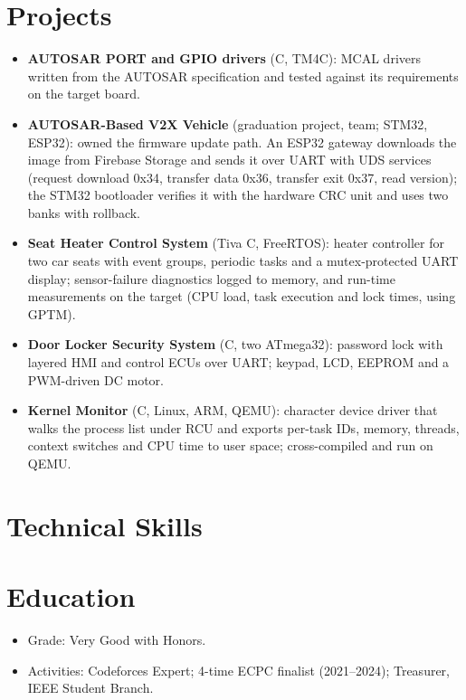 \documentclass[10pt]{article}
\begin{document}
\section*{Projects}
\begin{itemize}
  \item \textbf{AUTOSAR PORT and GPIO drivers} (C, TM4C): MCAL drivers written from the AUTOSAR specification and tested against its requirements on the target board.
  \item \textbf{AUTOSAR-Based V2X Vehicle} (graduation project, team; STM32, ESP32): owned the firmware update path. An ESP32 gateway downloads the image from Firebase Storage and sends it over UART with UDS services (request download 0x34, transfer data 0x36, transfer exit 0x37, read version); the STM32 bootloader verifies it with the hardware CRC unit and uses two banks with rollback. 
  \item \textbf{Seat Heater Control System} (Tiva C, FreeRTOS): heater controller for two car seats with event groups, periodic tasks and a mutex-protected UART display; sensor-failure diagnostics logged to memory, and run-time measurements on the target (CPU load, task execution and lock times, using GPTM). 
  \item \textbf{Door Locker Security System} (C, two ATmega32): password lock with layered HMI and control ECUs over UART; keypad, LCD, EEPROM and a PWM-driven DC motor. 
  \item \textbf{Kernel Monitor} (C, Linux, ARM, QEMU): character device driver that walks the process list under RCU and exports per-task IDs, memory, threads, context switches and CPU time to user space; cross-compiled and run on QEMU. 
\end{itemize}

\section*{Technical Skills}

\section*{Education}
\begin{itemize}
  \item Grade: Very Good with Honors.
  \item Activities: Codeforces Expert; 4-time ECPC finalist (2021--2024); Treasurer, IEEE Student Branch.
\end{itemize}
\end{document}
